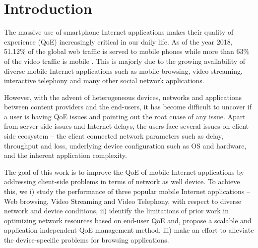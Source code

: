 \section{Introduction}
The massive use of smartphone Internet applications makes their quality of experience (QoE) increasingly critical in our daily life. 
As of the year 2018, 51.12\% of the global web traffic is served to mobile phones while more than 63\% of the video traffic is mobile \cite{statista2}. 
This is majorly due to the growing availability of diverse mobile Internet applications such as mobile browsing, video streaming, interactive telephony and many other social network applications.

However, with the advent of heterogeneous devices, networks and applications between content providers and the end-users, it has become difficult to uncover if a user is having QoE issues and pointing out the root cuase of any issue. 
Apart from server-side issues and Internet delays, the users face several issues on client-side ecosystem -- the client connected network parameters such as delay, throughput and loss, underlying device configuration such as OS and hardware, and the inherent application complexity.

The goal of this work is to improve the QoE of mobile Internet applications by addressing client-side problems in terms of network as well device. 
To achieve this, we i) study the performance of three popular mobile Internet applications -- Web browsing, Video Streaming and Video Telephony, with respect to diverse network and device conditions, ii) identify the limitations of prior work in optimizing network resources based on end-user QoE and, propose a scalable and application independent QoE management method, iii) make an effort to alleviate the device-specific problems for browsing applications.

